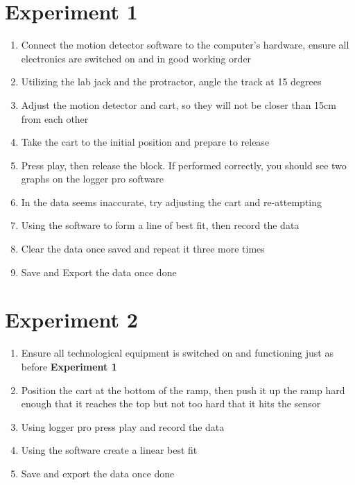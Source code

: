 

{}

\section{{Experiment 1}}

{}

\begin{enumerate}
	\item {Connect the motion detector software to the computer’s hardware, ensure all electronics are switched on and in good working order}
	\item {Utilizing the lab jack and the protractor, angle the track at 15 degrees}
	\item {Adjust the motion detector and cart, so they will not be closer than 15cm from each other}
	\item {Take the cart to the initial position and prepare to release}
	\item {Press play, then release the block. If performed correctly, you should see two graphs on the logger pro software}
	\item {In the data seems inaccurate, try adjusting the cart and re-attempting}
	\item {Using the software to form a line of best fit, then record the data}
	\item {Clear the data once saved and repeat it three more times}
	\item {Save and Export the data once done}
\end{enumerate}

\section{{Experiment 2}}

{}

\begin{enumerate}
	\item {Ensure all technological equipment is switched on and functioning just as before \textbf{Experiment 1}}
	\item {Position the cart at the bottom of the ramp, then push it up the ramp hard enough that it reaches the top but not too hard that it hits the sensor}
	\item {Using logger pro press play and record the data}
	\item {Using the software create a linear best fit}
	\item {Save and export the data once done}
\end{enumerate}

